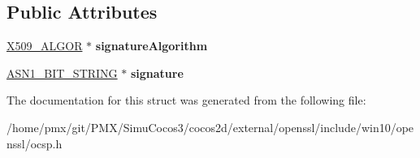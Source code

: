 \subsection*{Public Attributes}
\begin{DoxyCompactItemize}
\item 
\mbox{\label{structocsp__signature__st_a6c7ac15576a2cbfeae06fd4d1134d324}} 
\hyperlink{structX509__algor__st}{X509\+\_\+\+A\+L\+G\+OR} $\ast$ {\bfseries signature\+Algorithm}
\item 
\mbox{\label{structocsp__signature__st_a56ff8ee97dc7551d6b0d5981a183135e}} 
\hyperlink{structasn1__string__st}{A\+S\+N1\+\_\+\+B\+I\+T\+\_\+\+S\+T\+R\+I\+NG} $\ast$ {\bfseries signature}
\end{DoxyCompactItemize}


The documentation for this struct was generated from the following file\+:\begin{DoxyCompactItemize}
\item 
/home/pmx/git/\+P\+M\+X/\+Simu\+Cocos3/cocos2d/external/openssl/include/win10/openssl/ocsp.\+h\end{DoxyCompactItemize}
